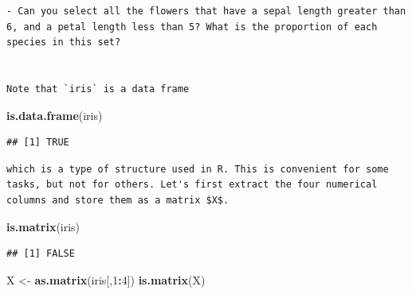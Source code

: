 \documentclass[]{book}
\newenvironment{Shaded}{\begin{snugshade}}{\end{snugshade}}
\newcommand{\DecValTok}[1]{\textcolor[rgb]{0.00,0.00,0.81}{#1}}
\newcommand{\FloatTok}[1]{\textcolor[rgb]{0.00,0.00,0.81}{#1}}
\newcommand{\KeywordTok}[1]{\textcolor[rgb]{0.13,0.29,0.53}{\textbf{#1}}}
\newcommand{\NormalTok}[1]{#1}
\newcommand{\OperatorTok}[1]{\textcolor[rgb]{0.81,0.36,0.00}{\textbf{#1}}}
\newcommand{\StringTok}[1]{\textcolor[rgb]{0.31,0.60,0.02}{#1}}
\theoremstyle{definition}
\theoremstyle{definition}
\theoremstyle{definition}
\theoremstyle{remark}
\begin{document}
\begin{Shaded}
\end{Shaded}

\begin{verbatim}
- Can you select all the flowers that have a sepal length greater than 6, and a petal length less than 5? What is the proportion of each species in this set? 


Note that `iris` is a data frame
\end{verbatim}

\begin{Shaded}
\begin{Highlighting}[]
\KeywordTok{is.data.frame}\NormalTok{(iris)}
\end{Highlighting}
\end{Shaded}

\begin{verbatim}
## [1] TRUE
\end{verbatim}

\begin{verbatim}
which is a type of structure used in R. This is convenient for some tasks, but not for others. Let's first extract the four numerical columns and store them as a matrix $X$.
\end{verbatim}

\begin{Shaded}
\begin{Highlighting}[]
\KeywordTok{is.matrix}\NormalTok{(iris)}
\end{Highlighting}
\end{Shaded}

\begin{verbatim}
## [1] FALSE
\end{verbatim}

\begin{Shaded}
\begin{Highlighting}[]
\NormalTok{X <-}\StringTok{ }\KeywordTok{as.matrix}\NormalTok{(iris[,}\DecValTok{1}\OperatorTok{:}\DecValTok{4}\NormalTok{])}
\KeywordTok{is.matrix}\NormalTok{(X)}
\end{Highlighting}
\end{Shaded}
\end{document}
